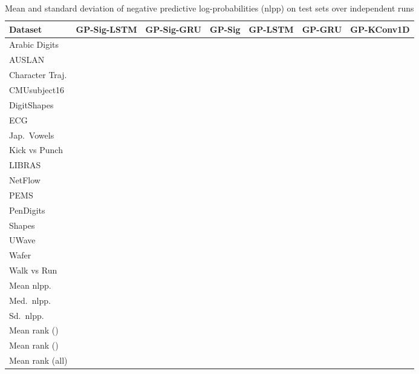 \documentclass{article}
\begin{document}
\begin{table*}[ht]
	\caption{Mean and standard deviation of negative predictive log-probabilities (nlpp) on test sets over  independent runs}
	\label{table:full_nlpp_results}
	\vskip 0.15in
	\begin{center}
		\begin{small}
			\begin{sc}
				\begin{tabular}{lcccccc}\toprule
					Dataset & GP-Sig-LSTM & GP-Sig-GRU & GP-Sig & GP-LSTM  & GP-GRU & GP-KConv1D\\
					\midrule
                        Arabic Digits &  &  &  &  &  &  \\ 
                        AUSLAN &  &  &  &  &  &  \\ 
                        Character Traj. &  &  &  &  &  &  \\ 
                        CMUsubject16 &  &  &  &  &  &  \\ 
                        DigitShapes &  &  &  &  &  &  \\ 
                        ECG &  &  &  &  &  &  \\ 
                        Jap.~Vowels &  &  &  &  &  &  \\ 
                        Kick vs Punch &  &  &  &  &  &  \\ 
                        LIBRAS &  &  &  &  &  &  \\ 
                        NetFlow &  &  &  &  &  &  \\ 
                        PEMS &  &  &  &  &  &  \\ 
                        PenDigits &  &  &  &  &  &  \\ 
                        Shapes &  &  &  &  &  &  \\ 
                        UWave &  &  &  &  &  &  \\ 
                        Wafer &  &  &  &  &  &  \\ 
                        Walk vs Run &  &  &  &  &  &  \\
                        \midrule
                        Mean nlpp. &  &  &  &  &  &  \\
                        Med.~nlpp. &  &  &  &  &  &  \\
                        Sd.~nlpp. &  &  &  &  &  &  \\
                        \midrule
                        Mean rank () &  &  &  &  &  &  \\ 
                        Mean rank () &  &  &  &  &  &  \\ 
                        Mean rank (all) &  &  &  &  &  &  \\
                    \bottomrule
				\end{tabular}
			\end{sc}
		\end{small}
	\end{center}
\end{table*}
\end{document}
